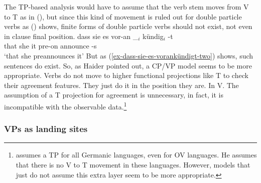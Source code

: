 The TP-based analysis would have to assume that the verb stem  moves from V to T as in (), but
since this kind of movement is ruled out for double particle verbs as () shows, finite forms
of double particle verbs should not exist, not even in clause final position.
\ea 
\gll dass sie es vor-an \_$_i$ kündig$_i$ -t\\
     that she it pre-on {}    announce -s\\
\glt `that she preannounces it'
\z
But as (\ref{ex-dass-sie-es-vorankündigt-two}) shows, such sentences do exist. So, as Haider pointed
out, a CP/VP model seems to be more appropriate. Verbs do not move to higher functional projections
like T to check their agreement features. They just do it in the position they are. In V. The
assumption of a T projection for agreement is unnecessary, in fact, it is incompatible with the
observable data.\footnote{%
  \citet{Vikner2001a} assumes a TP for all Germanic languages, even for OV languages. He assumes
  that there is no V to T movement in these languages. However, models that just do not assume this
  extra layer seem to be more appropriate.
}

\subsubsection{VPs as landing sites}
\label{sec-cp-tp-vp-extraposition}


